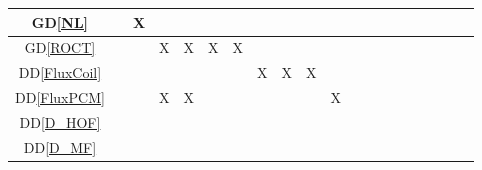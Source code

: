 \documentclass[12pt]{article}
\newcommand{\dref}[1]{GD\ref{#1}}
\newcommand{\ddref}[1]{DD\ref{#1}}
\begin{document}
{\begin{landscape}
\begin{table}[h!]
\begin{tabular}{|c|c|c|c|c|c|c|c|c|c|c|c|c|c|c|c|c|c|c|c|}
        \dref{NL}           &                            & X               &                &               &                        &                  &                    &                &                 &                   &                 &                   &                     &                  &                &                   &               &                    &                   \\ \hline
        \dref{ROCT}         &                            &                 & X              & X             & X                      & X                &                    &                &                 &                   &                 &                   &                     &                  &                &                   &               &                    &                   \\ \hline
        \ddref{FluxCoil}    &                            &                 &                &               &                        &                  & X                  & X              & X               &                   &                 &                   &                     &                  &                &                   &               &                    &                   \\ \hline
        \ddref{FluxPCM}     &                            &                 & X              & X             &                        &                  &                    &                &                 & X                 &                 &                   &                     &                  &                &                   &               &                    &                   \\ \hline
        \ddref{D_HOF}       &                            &                 &                &               &                        &                  &                    &                &                 &                   &                 &                   &                     &                  &                &                   &               &                    &                   \\ \hline
        \ddref{D_MF}        &                            &                 &                &               &                        &                  &                    &                &                 &                   &                 &                   &                     &                  &                &                   &               &                    &                   \\ \hline

\end{tabular}
\end{table}
\end{landscape}}
\end{document}
